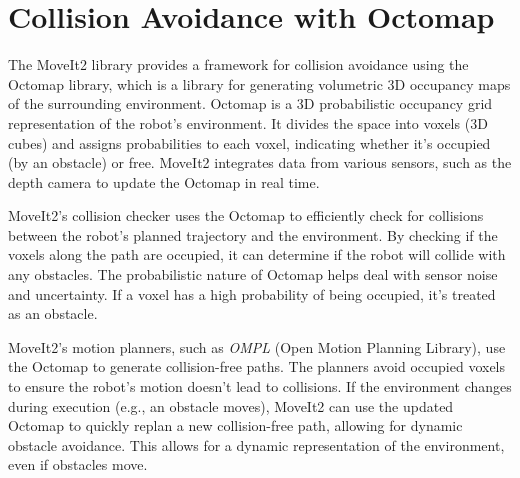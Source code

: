 \section{Collision Avoidance with Octomap}

The MoveIt2 library provides a framework for collision avoidance using the Octomap library, which is a library for
generating volumetric 3D occupancy maps of the surrounding environment.
Octomap is a 3D probabilistic occupancy grid representation of the robot's environment. It divides the space into voxels
(3D cubes) and assigns probabilities to each voxel, indicating whether it's occupied (by an obstacle) or free.
MoveIt2 integrates data from various sensors, such as the depth camera to update the Octomap in real time.

MoveIt2's collision checker uses the Octomap to efficiently check for collisions between the robot's planned trajectory
and the environment. By checking if the voxels along the path are occupied, it can determine if the robot will collide 
with any obstacles. The probabilistic nature of Octomap helps deal with sensor noise and uncertainty. 
If a voxel has a high probability of being occupied, it's treated as an obstacle.

MoveIt2's motion planners, such as \textit{OMPL} (Open Motion Planning Library), use the Octomap
to generate collision-free paths. The planners avoid occupied voxels to ensure the robot's motion doesn't lead to collisions.
If the environment changes during execution (e.g., an obstacle moves), MoveIt2 can use the updated Octomap 
to quickly replan a new collision-free path, allowing for dynamic obstacle avoidance.
This allows for a dynamic representation of the environment, even if obstacles move.


